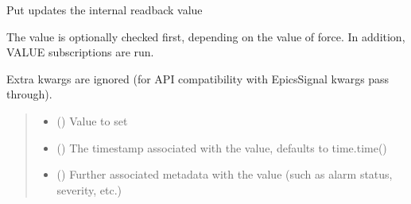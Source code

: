 \documentclass[letterpaper,10pt,english]{sphinxmanual}
\begin{document}
\begin{fulllineitems}
\label{\detokenize{API:raypyng_bluesky.signal.RayPySignalRO}}
\pysigstartsignatures
{}
\pysigstopsignatures{}

\begin{fulllineitems}
\label{\detokenize{API:raypyng_bluesky.signal.RayPySignalRO.put}}
\pysigstartsignatures
{}
\pysigstopsignatures
\sphinxAtStartPar
Put updates the internal readback value

\sphinxAtStartPar
The value is optionally checked first, depending on the value of force.
In addition, VALUE subscriptions are run.

\sphinxAtStartPar
Extra kwargs are ignored (for API compatibility with EpicsSignal kwargs
pass through).
\begin{quote}\begin{description}
\begin{itemize}
\item {} 
\sphinxAtStartPar
{} () \textendash{} Value to set

\item {} 
\sphinxAtStartPar
{} (\sphinxstyleliteralemphasis{\sphinxupquote{, }}) \textendash{} The timestamp associated with the value, defaults to time.time()

\item {} 
\sphinxAtStartPar
{} (\sphinxstyleliteralemphasis{\sphinxupquote{, }}) \textendash{} Further associated metadata with the value (such as alarm status,
severity, etc.)


\end{itemize}
\end{description}
\end{quote}
\end{fulllineitems}
\end{fulllineitems}
\end{document}
